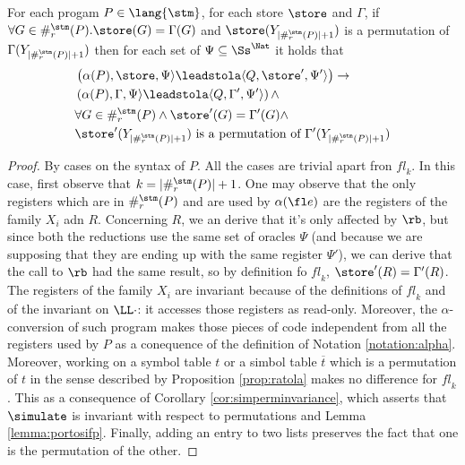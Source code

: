 \begin{lemma}
  \label{lemma:workreginvariance}
  For each progam $P \in \lang{\stm}$, for each store $\store$ and $\Gamma$,
  if $\forall G \in \#_r^\stm(P).\store(G)=\Gamma(G)$ and
  $\store(Y_{{|\#_r^\stm(P)|+1}})$ is a permutation of
  $\Gamma(Y_{{|\#_r^\stm(P)|+1}})$ then for each set of
  $\Psi \subseteq \Ss^\Nat$ it holds that
  \begin{align*}
    &\left(\alpha(P), \store, \Psi\rangle \leadstola \langle Q, \store', \Psi'\rangle\right)\to\\
    &\left(\alpha(P), \Gamma, \Psi\rangle \leadstola \langle Q, \Gamma', \Psi'\rangle\right)\land\\
    &\forall G \in \#_r^\stm(P)\land \store'(G)=\Gamma'(G) \land\\
    &\store'(Y_{{|\#_r^\stm(P)|+1}}) \text{ is a permutation of }\Gamma'(Y_{{|\#_r^\stm(P)|+1}})
  \end{align*}
\end{lemma}

\begin{proof}
  By cases on the syntax of $P$. All the cases are trivial apart fron $\mathit{fl}_k$.
  In this case, first observe that $k={|\#_r^\stm(P)|+1}$. One may observe that
  the only registers which are in  $\#_r^\stm(P)$ and are used by $\alpha(\fl e)$
  are the registers of the family $X_i$ adn $R$. Concerning $R$, we an derive that
  it's only affected by $\rb$, but since both the reductions use the same set of
  oracles $\Psi$ (and because we are supposing that they are ending up with the
  same register $\Psi'$), we can derive that the call to $\rb$ had the same result,
  so by definition fo $\mathit{fl}_k$, $\store'(R)=\Gamma'(R)$. The registers of
  the family $X_i$ are invariant because of the definitions of $\mathit{fl}_k$
  and of the invariant on $\LL\cdot$: it accesses those registers as read-only.
  Moreover, the $\alpha$-conversion of such program makes those pieces of code
  independent from all the registers used by $P$ as a conequence of the definition
  of Notation \ref{notation:alpha}. Moreover, working on a symbol table $t$ or
  a simbol table $\overline t$ which is a permutation of $t$ in the sense described
  by Proposition \ref{prop:ratola} makes no difference for $\mathit{fl}_k$.
  This as a consequence of Corollary \ref{cor:simperminvariance}, which asserts
  that $\simulate$ is invariant with respect to permutations and Lemma \ref{lemma:portosifp}.
  Finally, adding an entry to two lists preserves the fact that one is the permutation
  of the other.
\end{proof}

